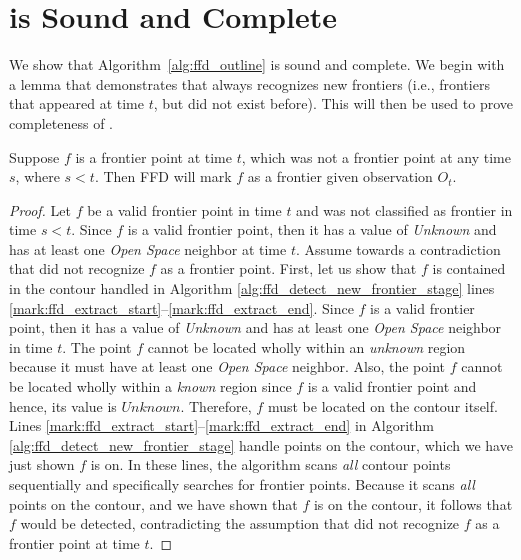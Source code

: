 \section{\FFD is Sound and Complete}
\label{section:ffd_sound_and_complete}
We show that Algorithm~\ref{alg:ffd_outline} is sound and complete.
We begin with a lemma that demonstrates that \FFD always recognizes new
frontiers (i.e., frontiers that appeared at time $t$, but did not exist before).
This will then be used to prove completeness of \FFD.
\begin{lemma}
\label{lem:newf}
Suppose $f$ is a frontier point at time $t$, which was not a frontier point at
any time $s$, where $s<t$. Then FFD will mark $f$ as a frontier given
observation $O_t$.
\end{lemma}
\begin{proof}
Let $f$ be a valid frontier point in time $t$ and was not classified as
frontier in time $s<t$. Since $f$ is a valid frontier point, then it has a
value of \emph{Unknown} and has at least one \emph{Open Space} neighbor at time
$t$. 
Assume towards a contradiction that \FFD did not recognize $f$ as a frontier
point. First, let us show that $f$ is contained in the contour handled
in Algorithm \ref{alg:ffd_detect_new_frontier_stage} lines
\ref{mark:ffd_extract_start}--\ref{mark:ffd_extract_end}.
Since $f$ is a valid frontier point, then it has a value
of \emph{Unknown} and has at least one \emph{Open Space} neighbor in time
$t$. The point $f$ cannot be located wholly within an \textit{unknown} region because it must
have at least one \emph{Open Space} neighbor. Also, the point $f$ cannot be
located wholly within a \textit{known} region since $f$ is a valid frontier point and
hence, its value is $Unknown$. Therefore, $f$ must be located on the contour
itself.
Lines \ref{mark:ffd_extract_start}--\ref{mark:ffd_extract_end} in Algorithm
\ref{alg:ffd_detect_new_frontier_stage} handle points on the contour, which we
have just shown $f$ is on. In these lines, the \FFD algorithm scans \emph{all}
contour points sequentially and specifically searches for frontier points.
Because it scans \emph{all} points on the contour, and we have shown that $f$
is on the contour, it follows that $f$ would be detected, contradicting the
assumption that \FFD did not recognize $f$ as a frontier point at time $t$.
\end{proof}


